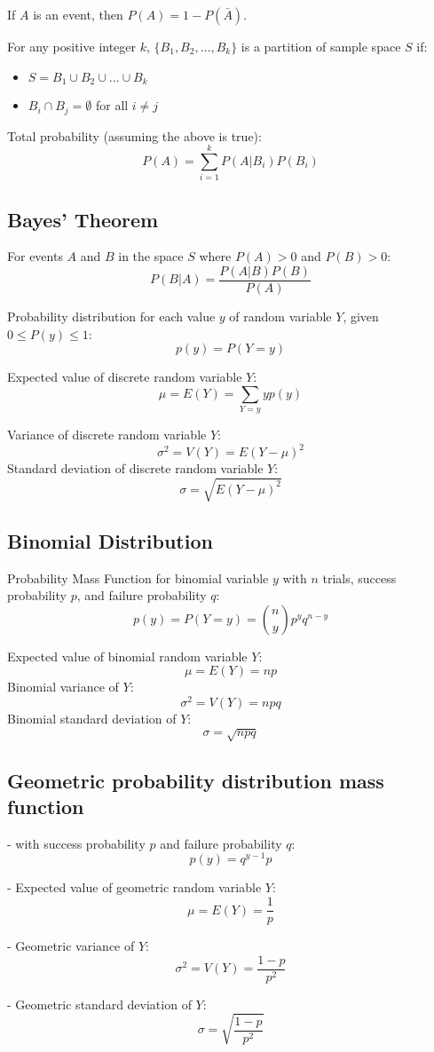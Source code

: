 \documentclass{article}
\begin{document}
If \( A \) is an event, then \( P(A) = 1 - P(\bar{A}) \).

For any positive integer \( k \), \( \{B_1, B_2, \dots, B_k\} \) is a partition of sample space \( S \) if:
\begin{itemize}
    \item \( S = B_1 \cup B_2 \cup \dots \cup B_k \)
    \item \( B_i \cap B_j = \emptyset \) for all \( i \neq j \)
\end{itemize}

Total probability (assuming the above is true):
\[
P(A) = \sum_{i=1}^{k} P(A|B_i) P(B_i)
\]

\subsection*{Bayes’ Theorem}
For events \( A \) and \( B \) in the space \( S \) where \( P(A) > 0 \) and \( P(B) > 0 \):
\[
P(B|A) = \frac{P(A|B) P(B)}{P(A)}
\]

Probability distribution for each value \( y \) of random variable \( Y \), given \( 0 \leq P(y) \leq 1 \):
\[
p(y) = P(Y = y)
\]

Expected value of discrete random variable \( Y \):
\[
\mu = E(Y) = \sum_{Y=y} y p(y)
\]

Variance of discrete random variable \( Y \):
\[
\sigma^2 = V(Y) = E(Y - \mu)^2
\]
Standard deviation of discrete random variable \( Y \):
\[
\sigma = \sqrt{E(Y - \mu)^2}
\]

\subsection*{Binomial Distribution}
Probability Mass Function for binomial variable \( y \) with \( n \) trials, success probability \( p \), and failure probability \( q \):
\[
p(y) = P(Y = y) = \binom{n}{y} p^y q^{n-y}
\]

Expected value of binomial random variable \( Y \):
\[
\mu = E(Y) = np
\]
Binomial variance of \( Y \):
\[
\sigma^2 = V(Y) = npq
\]
Binomial standard deviation of \( Y \):
\[
\sigma = \sqrt{npq}
\]
\subsection{Geometric probability distribution mass function}
- with success probability \( p \) and failure probability \( q \):
\[
p(y) = q^{y-1} p
\]

- Expected value of geometric random variable \( Y \):
\[
\mu = E(Y) = \frac{1}{p}
\]

- Geometric variance of \( Y \):
\[
\sigma^2 = V(Y) = \frac{1 - p}{p^2}
\]

- Geometric standard deviation of \( Y \):
\[
\sigma = \sqrt{\frac{1 - p}{p^2}}
\]
\end{document}
